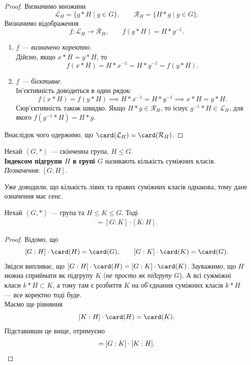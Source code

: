 \documentclass{math_library}
\begin{document}
\begin{proof}
Визначимо множини \[
\mathcal{L}_H = \{g*H \mid g \in G\}, \qquad \mathcal{R}_H = \{H*g \mid g \in G\}.
\]
Визначимо відображення \[
f \colon \mathcal{L}_H \to \mathcal{R}_H, \qquad f(g*H) = H*g^{-1}.
\]
\begin{enumerate}[wide=0pt,label={\Roman*.}]
\item \textit{$f$ --- визначено коректно}.\\
Дійсно, якщо $x*H = y*H$, то 
\[
f(x*H) = H*x^{-1} =H*y^{-1} = f(y*H).
\]
\item \textit{$f$ --- бієктивне}.\\
Ін'єктивність доводиться в один рядок:
\[
f(x*H) = f(y*H) \implies H*x^{-1} = H*y^{-1} \implies x*H = y*H.
\]
Сюр'єктивність також швидко. Якщо $H*g \in \mathcal{R}_H$, то існує $g^{-1}*H \in \mathcal{L}_H$, для якого $f(g^{-1}*H) = H*g$.
\end{enumerate}
Внаслідок чого одержимо, що $\card(\mathcal{L}_H) = \card(\mathcal{R}_H)$.
\end{proof}

\begin{definition}
Нехай $\left< G, * \right>$ --- скінченна група, $H \leq G$.\\
\textbf{Індексом підгрупи $H$ в групі $G$} називають кількість суміжних класів.\\
\textit{Позначення}: $[G:H]$.
\end{definition}

\begin{remark}
Уже доводили, що кількість лівих та правих суміжних класів однакова, тому дане означення має сенс.
\end{remark}

\begin{proposition}
Нехай $\left< G,*\right>$ --- група та $H \leq K \leq G$. Тоді
\begin{align*}
[G:H] = [G:K] \cdot [K:H].
\end{align*}
\end{proposition}

\begin{proof}
Відомо, що
\[
[G:H] \cdot \card(H) = \card(G), \qquad [G:K] \cdot \card(K) = \card(G).
\]
Звідси випливає, що $[G:H] \cdot \card(H) = [G:K] \cdot \card(K)$. Зауважимо, що $H$ можна сприймати як підгрупу $K$ (\textit{не просто як підгрупу $G$}). А всі сужміжні класи $k*H \subset K$, а тому там є розбиття $K$ на об'єднання суміжних класів $k*H$ --- все коректно тоді буде.\\
Маємо ще рівняння \[ 
[K:H] \cdot \card(H) = \card(K).
\] 
Підставивши це вище, отримуємо 
\begin{gather*}
[G:H] = [G:K] \cdot [K:H]. \qedhere
\end{gather*} 
\end{proof}
\end{document}
